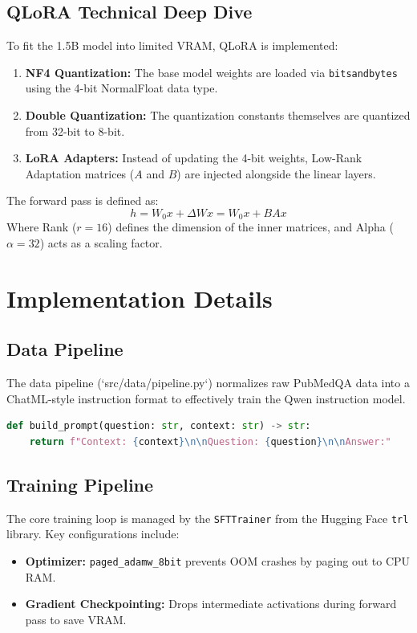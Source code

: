 \documentclass[12pt,a4paper]{report}
\begin{document}
\section{QLoRA Technical Deep Dive}
To fit the 1.5B model into limited VRAM, QLoRA is implemented:
\begin{enumerate}
    \item \textbf{NF4 Quantization:} The base model weights are loaded via \texttt{bitsandbytes} using the 4-bit NormalFloat data type.
    \item \textbf{Double Quantization:} The quantization constants themselves are quantized from 32-bit to 8-bit.
    \item \textbf{LoRA Adapters:} Instead of updating the 4-bit weights, Low-Rank Adaptation matrices ($A$ and $B$) are injected alongside the linear layers.
\end{enumerate}
The forward pass is defined as:
\begin{equation}
    h = W_0x + \Delta Wx = W_0x + BAx
\end{equation}
Where Rank ($r=16$) defines the dimension of the inner matrices, and Alpha ($\alpha=32$) acts as a scaling factor.

\chapter{Implementation Details}

\section{Data Pipeline}
The data pipeline (`src/data/pipeline.py`) normalizes raw PubMedQA data into a ChatML-style instruction format to effectively train the Qwen instruction model.
\begin{lstlisting}[language=Python, caption=Prompt Formatting Logic]
def build_prompt(question: str, context: str) -> str:
    return f"Context: {context}\n\nQuestion: {question}\n\nAnswer:"
\end{lstlisting}

\section{Training Pipeline}
The core training loop is managed by the \texttt{SFTTrainer} from the Hugging Face \texttt{trl} library. Key configurations include:
\begin{itemize}
    \item \textbf{Optimizer:} \texttt{paged\_adamw\_8bit} prevents OOM crashes by paging out to CPU RAM.
    \item \textbf{Gradient Checkpointing:} Drops intermediate activations during forward pass to save VRAM.
\end{itemize}
\end{document}
